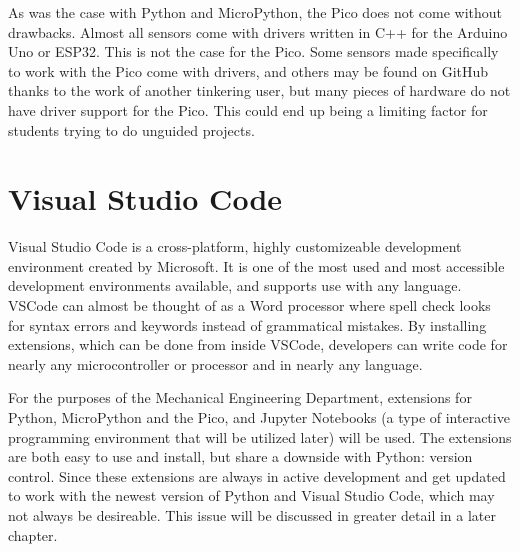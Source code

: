 As was the case with Python and MicroPython, the Pico does not come without drawbacks. Almost all 
sensors come with drivers written in C++ for the Arduino Uno or ESP32. This is not the case for 
the Pico. Some sensors made specifically to work with the Pico come with drivers, and others may 
be found on GitHub thanks to the work of another tinkering user, but many pieces of hardware do 
not have driver support for the Pico. This could end up being a limiting factor for students trying 
to do unguided projects.

\section{Visual Studio Code}

Visual Studio Code is a cross-platform, highly customizeable development environment created by
Microsoft. It is one of the most used and most accessible development environments available, 
and supports use with any language. VSCode can almost be thought of as a Word processor where 
spell check looks for syntax errors and keywords instead of grammatical mistakes. By installing
extensions, which can be done from inside VSCode, developers can write code for nearly any 
microcontroller or processor and in nearly any language.

For the purposes of the Mechanical Engineering Department, extensions for Python, MicroPython and
the Pico, and Jupyter Notebooks (a type of interactive programming environment that will be utilized
later) will be used. The extensions are both easy to use and install, but share a downside with
Python: version control. Since these extensions are always in active development and get updated
to work with the newest version of Python and Visual Studio Code, which may not always be desireable.
This issue will be discussed in greater detail in a later chapter.
